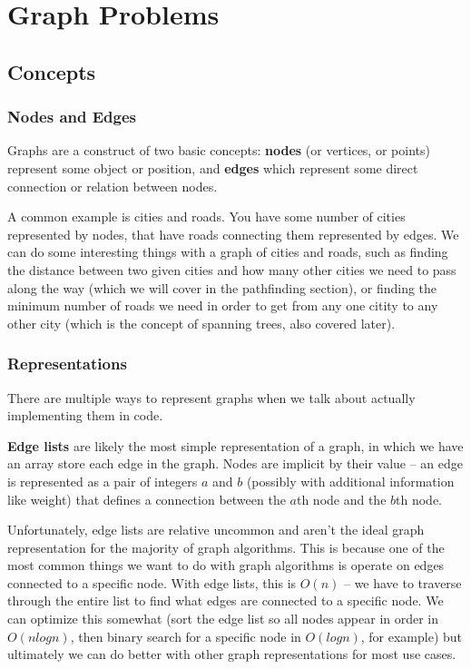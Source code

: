 \section{Graph Problems}

\subsection{Concepts}

\subsubsection{Nodes and Edges}
 

Graphs are a construct of two basic concepts: \textbf{nodes} (or vertices, or points) represent some object or position, and \textbf{edges} which represent some direct connection or relation between nodes.

A common example is cities and roads. You have some number of cities represented by nodes, that have roads connecting them represented by edges. We can do some interesting things with a graph of cities and roads, such as finding the distance between two given cities and how many other cities we need to pass along the way (which we will cover in the pathfinding section), or finding the minimum number of roads we need in order to get from any one citity to any other city (which is the concept of spanning trees, also covered later).

\subsubsection{Representations}

There are multiple ways to represent graphs when we talk about actually implementing them in code.

\textbf{Edge lists}  are likely the most simple representation of a graph, in which we have an array store each edge in the graph. Nodes are implicit by their value -- an edge is represented as a pair of integers $a$ and $b$ (possibly with additional information like weight) that defines a connection between the $a$th node and the $b$th node.


Unfortunately, edge lists are relative uncommon and aren't the ideal graph representation for the majority of graph algorithms. This is because one of the most common things we want to do with graph algorithms is operate on edges connected to a specific node. With edge lists, this is $O(n)$ -- we have to traverse through the entire list to find what edges are connected to a specific node. We can optimize this somewhat (sort the edge list so all nodes appear in order in $O(n log n)$, then binary search for a specific node in $O(log n)$, for example) but ultimately we can do better with other graph representations for most use cases.


